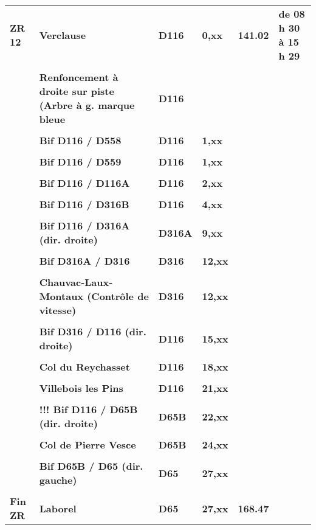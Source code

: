 \documentclass{article}%
\begin{document}
\begin{longtable}{p{2.25cm}|p{7.0cm}|p{1.5cm}|p{1.5cm}|p{1.5cm}|p{3.5cm}}
\textbf{ZR 12      }&\textbf{Verclause }&\textbf{D116}&\textbf{0,xx}&\textbf{141.02}&\textbf{de 08 h 30 à 15 h 29}\\%
 & & & & & \\%
 &\textbf{Renfoncement à droite sur piste (Arbre à g. marque bleue}&\textbf{D116}& & & \\%
 & & & & & \\%
 &\textbf{Bif D116 / D558 }&\textbf{D116}&\textbf{1,xx}& & \\%
 & & & & & \\%
 &\textbf{Bif D116 / D559 }&\textbf{D116 }&\textbf{1,xx}& & \\%
 & & & & & \\%
 &\textbf{Bif D116 / D116A}&\textbf{D116}&\textbf{2,xx}& & \\%
 & & & & & \\%
 &\textbf{Bif D116 / D316B}&\textbf{D116}&\textbf{4,xx}& & \\%
 & & & & & \\%
 &\textbf{Bif D116 / D316A (dir. droite)}&\textbf{D316A}&\textbf{9,xx}& & \\%
 & & & & & \\%
 &\textbf{Bif D316A / D316 }&\textbf{D316}&\textbf{12,xx}& & \\%
 & & & & & \\%
 &\textbf{Chauvac-Laux-Montaux (Contrôle de vitesse)}&\textbf{D316}&\textbf{12,xx}& & \\%
 & & & & & \\%
 &\textbf{Bif D316 / D116 (dir. droite)}&\textbf{D116}&\textbf{15,xx}& & \\%
 & & & & & \\%
 &\textbf{Col du Reychasset}&\textbf{D116}&\textbf{18,xx}& & \\%
 & & & & & \\%
 &\textbf{Villebois les Pins}&\textbf{D116}&\textbf{21,xx}& & \\%
 & & & & & \\%
 &\textbf{!!! Bif D116 / D65B (dir. droite)}&\textbf{D65B}&\textbf{22,xx}& & \\%
 & & & & & \\%
 &\textbf{Col de Pierre Vesce}&\textbf{D65B}&\textbf{24,xx}& & \\%
 & & & & & \\%
 &\textbf{Bif D65B / D65 (dir. gauche)}&\textbf{D65}&\textbf{27,xx}& & \\%
 & & & & & \\%
\textbf{Fin ZR}&\textbf{Laborel }&\textbf{D65}&\textbf{27,xx}&\textbf{168.47}& \\%

\end{longtable}
\end{document}
